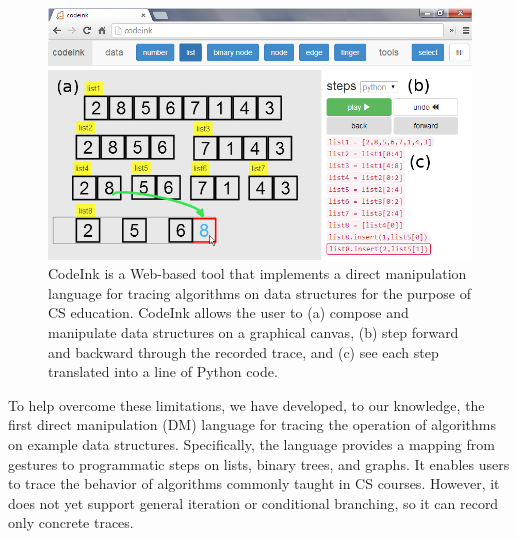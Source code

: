 \begin{figure}

\begin{center}
\includegraphics[width=\columnwidth]{img/frontpage-mergesort.png}
\end{center}

\vspace{-0.5em}

\caption{CodeInk is a Web-based tool that implements a direct
manipulation language for tracing algorithms on data structures for the
purpose of CS education. CodeInk allows the user to (a) compose and
manipulate data structures on a graphical canvas, (b) step forward and
backward through the recorded trace, and (c) see each step translated
into a line of Python code.}


\label{fig:codeink-intro}
\end{figure}

To help overcome these limitations, we have developed, to our knowledge, the
first direct manipulation (DM) language for tracing the operation of algorithms
on example data structures. Specifically, the language provides a mapping from
gestures to programmatic steps on lists, binary trees, and graphs. It enables
users to trace the behavior of algorithms commonly taught in CS courses.
However, it does not yet support general iteration or conditional branching, so
it can record only concrete traces.

